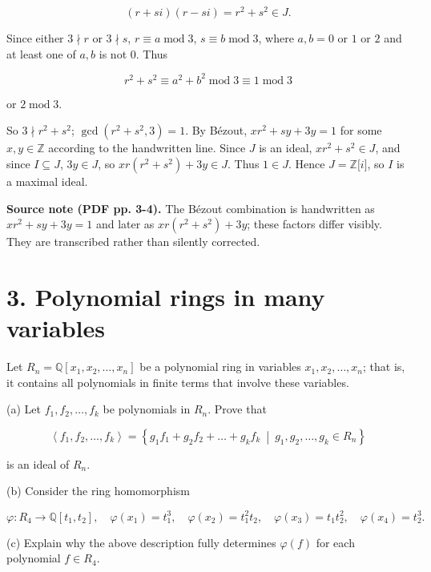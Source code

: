 \[\left( {r + si} \right)\left( {r - si} \right) = r^{2} + s^{2} \in J.\]

Since either \(3 \nmid r\) or \(3 \nmid s\), \(r \equiv a\operatorname{mod}3\), \(s \equiv b\operatorname{mod}3\), where \(a,b = 0\) or \(1\) or \(2\) and at least one of \(a,b\) is not \(0\). Thus

\[r^{2} + s^{2} \equiv a^{2} + b^{2}\operatorname{mod}3 \equiv 1\operatorname{mod}3\]

or \(2\operatorname{mod}3.\)

So \(3 \nmid r^{2} + s^{2}\); \(\gcd\left( {r^{2} + s^{2},3} \right) = 1\). By Bézout, \(xr^{2} + sy + 3y = 1\) for some \(x,y \in \mathbb{Z}\) according to the handwritten line. Since \(J\) is an ideal, \(xr^{2} + s^{2} \in J\), and since \(I \subseteq J\), \(3y \in J\), so \(xr\left( {r^{2} + s^{2}} \right) + 3y \in J\). Thus \(1 \in J\). Hence \(J = \mathbb{Z}\lbrack i\rbrack\), so \(I\) is a maximal ideal.

{\textbf{Source note (PDF pp. 3-4).} The Bézout combination is handwritten as \(xr^{2} + sy + 3y = 1\) and later as \(xr\left( {r^{2} + s^{2}} \right) + 3y\); these factors differ visibly. They are transcribed rather than silently corrected.}

\section{3. Polynomial rings in many variables}

Let \(R_{n} = \mathbb{Q}\left\lbrack {x_{1},x_{2},\ldots,x_{n}} \right\rbrack\) be a polynomial ring in variables \(x_{1},x_{2},\ldots,x_{n}\); that is, it contains all polynomials in finite terms that involve these variables.

(a) Let \(f_{1},f_{2},\ldots,f_{k}\) be polynomials in \(R_{n}\). Prove that

\[\left\langle {f_{1},f_{2},\ldots,f_{k}} \right\rangle = \left\{ g_{1}f_{1} + g_{2}f_{2} + \ldots + g_{k}f_{k}\  \middle| \ g_{1},g_{2},\ldots,g_{k} \in R_{n} \right\}\]

is an ideal of \(R_{n}\).

(b) Consider the ring homomorphism

\[\varphi:R_{4}\rightarrow\mathbb{Q}\left\lbrack {t_{1},t_{2}} \right\rbrack,\quad\varphi\left( x_{1} \right) = t_{1}^{3},\quad\varphi\left( x_{2} \right) = t_{1}^{2}t_{2},\quad\varphi\left( x_{3} \right) = t_{1}t_{2}^{2},\quad\varphi\left( x_{4} \right) = t_{2}^{3}.\]

(c) Explain why the above description fully determines \(\varphi(f)\) for each polynomial \(f \in R_{4}\).

